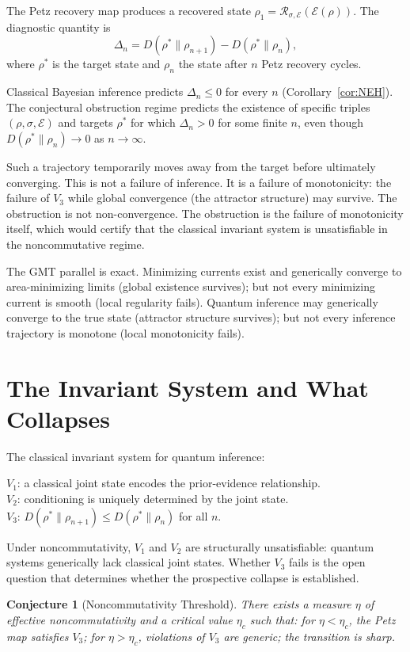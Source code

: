 \documentclass[12pt,oneside]{book}
\theoremstyle{plain}
\newtheorem{conjecture}[theorem]{Conjecture}
\theoremstyle{definition}
\theoremstyle{remark}
\begin{document}
The Petz recovery map produces a recovered state
$\rho_1 = \mathcal{R}_{\sigma,\mathcal{E}}(\mathcal{E}(\rho))$.
The diagnostic quantity is
\[
  \Delta_n = D(\rho^*\|\rho_{n+1}) - D(\rho^*\|\rho_n),
\]
where $\rho^*$ is the target state and $\rho_n$ the state after $n$ Petz
recovery cycles.

Classical Bayesian inference predicts $\Delta_n \leq 0$ for every $n$
(Corollary~\ref{cor:NEH}). The conjectural obstruction regime predicts the
existence of specific triples $(\rho, \sigma, \mathcal{E})$ and targets
$\rho^*$ for which $\Delta_n > 0$ for some finite $n$, even though
$D(\rho^*\|\rho_n) \to 0$ as $n \to \infty$.

Such a trajectory temporarily moves away from the target before ultimately
converging. This is not a failure of inference. It is a failure of monotonicity:
the failure of $V_3$ while global convergence (the attractor structure) may
survive. The obstruction is not non-convergence. The obstruction is the
failure of monotonicity itself, which would certify that the classical
invariant system is unsatisfiable in the noncommutative regime.

The GMT parallel is exact. Minimizing currents exist and generically converge
to area-minimizing limits (global existence survives); but not every
minimizing current is smooth (local regularity fails). Quantum inference may
generically converge to the true state (attractor structure survives); but
not every inference trajectory is monotone (local monotonicity fails).

\section{The Invariant System and What Collapses}

The classical invariant system for quantum inference:

$V_1$: a classical joint state encodes the prior-evidence relationship.\\
$V_2$: conditioning is uniquely determined by the joint state.\\
$V_3$: $D(\rho^*\|\rho_{n+1}) \leq D(\rho^*\|\rho_n)$ for all $n$.

Under noncommutativity, $V_1$ and $V_2$ are structurally unsatisfiable:
quantum systems generically lack classical joint states. Whether $V_3$
fails is the open question that determines whether the prospective collapse
is established.

\begin{conjecture}[Noncommutativity Threshold]
\label{conj:threshold}
There exists a measure $\eta$ of effective noncommutativity and a critical
value $\eta_c$ such that: for $\eta < \eta_c$, the Petz map satisfies $V_3$;
for $\eta > \eta_c$, violations of $V_3$ are generic; the transition is sharp.
\end{conjecture}
\end{document}
